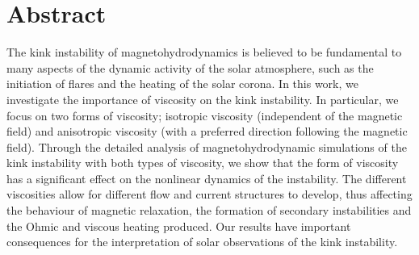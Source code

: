 \chapter{Abstract}

The kink instability of magnetohydrodynamics is believed to be fundamental to many aspects of the dynamic activity of the solar atmosphere, such as the initiation of flares and the heating of the solar corona. In this work, we investigate the importance of viscosity on the kink instability. In particular, we focus on two forms of viscosity; isotropic viscosity (independent of the magnetic field) and anisotropic viscosity (with a preferred direction following the magnetic field). Through the detailed analysis of magnetohydrodynamic simulations of the kink instability with both types of viscosity, we show that the form of viscosity has a significant effect on the nonlinear dynamics of the instability. The different viscosities allow for different flow and current structures to develop, thus affecting the behaviour of magnetic relaxation, the formation of secondary instabilities and the Ohmic and viscous heating produced. Our results have important consequences for the interpretation of solar observations of the kink instability.
